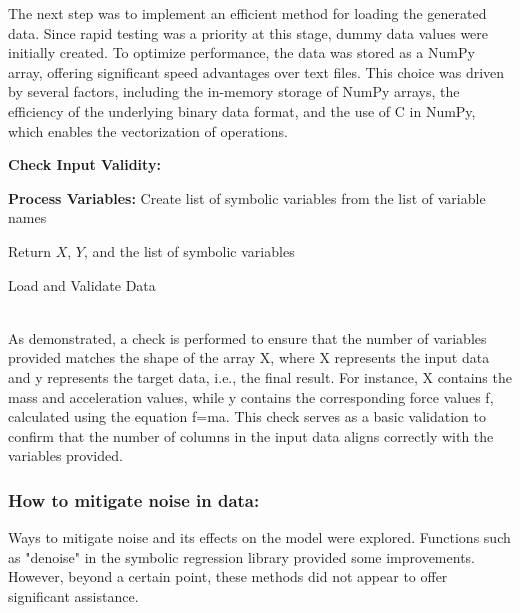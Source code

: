 \documentclass{article}
\begin{document}
The next step was to implement an efficient method for loading the generated data. Since rapid testing was a priority at this stage, dummy data values were initially created. To optimize performance, the data was stored as a NumPy array, offering significant speed advantages over text files. This choice was driven by several factors, including the in-memory storage of NumPy arrays, the efficiency of the underlying binary data format, and the use of C in NumPy, which enables the vectorization of operations.\\





\begin{algorithm}[H]
\SetAlgoLined
{}

\textbf{Check Input Validity:}\;

\textbf{Process Variables:}\;
Create list of symbolic variables from the list of variable names\;

Return \(X\), \(Y\), and the list of symbolic variables\;

\caption{Load and Validate Data}
\label{alg:load_data} %
\end{algorithm}\\



As demonstrated, a check is performed to ensure that the number of variables provided matches the shape of the array X, where X represents the input data and y represents the target data, i.e., the final result. For instance, X contains the mass and acceleration values, while y contains the corresponding force values f, calculated using the equation f=ma. This check serves as a basic validation to confirm that the number of columns in the input data aligns correctly with the variables provided.\\


\subsubsection{How to mitigate noise in data: }

Ways to mitigate noise and its effects on the model were explored. Functions such as "denoise" in the symbolic regression library provided some improvements. However, beyond a certain point, these methods did not appear to offer significant assistance.\\
\end{document}
